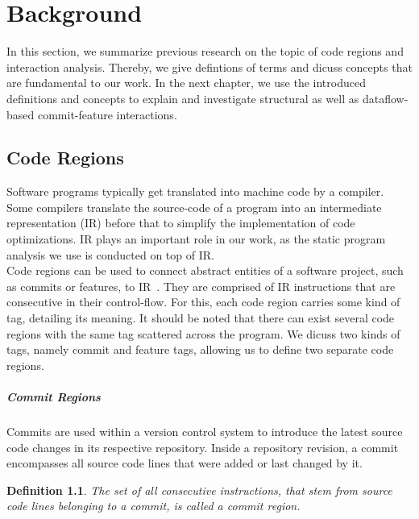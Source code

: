 \chapter{Background}\label{ch:background}

In this section, we summarize previous research on the topic of code regions and interaction analysis.
Thereby, we give defintions of terms and dicuss concepts that are fundamental to our work.
In the next chapter, we use the introduced definitions and concepts to explain and investigate structural as well as dataflow-based commit-feature interactions.

\section{Code Regions}\label{ch:code_regions}
Software programs typically get translated into machine code by a compiler.
Some compilers translate the source-code of a program into an intermediate representation (IR) before that to simplify the implementation of code optimizations.
IR plays an important role in our work, as the static program analysis we use is conducted on top of IR. \\
Code regions can be used to connect abstract entities of a software project, such as commits or features, to IR~\cite{sattler2023seal}.
They are comprised of IR instructions that are consecutive in their control-flow.
For this, each code region carries some kind of tag, detailing its meaning.
It should be noted that there can exist several code regions with the same tag scattered across the program.
We dicuss two kinds of tags, namely commit and feature tags, allowing us to define two separate code regions. 

\paragraph{Commit Regions}\label{sec:commit_regions}

Commits are used within a version control system to introduce the latest source code changes in its respective repository.
Inside a repository revision, a commit encompasses all source code lines that were added or last changed by it. 

\newtheorem{definition}{Definition}
\newcommand{\definitionautorefname}{Definition}
\begin{definition}\label{def:commit_regions}
	\emph{The set of all consecutive instructions, that stem from source code lines belonging to a commit, is called a} commit region.
\end{definition}

